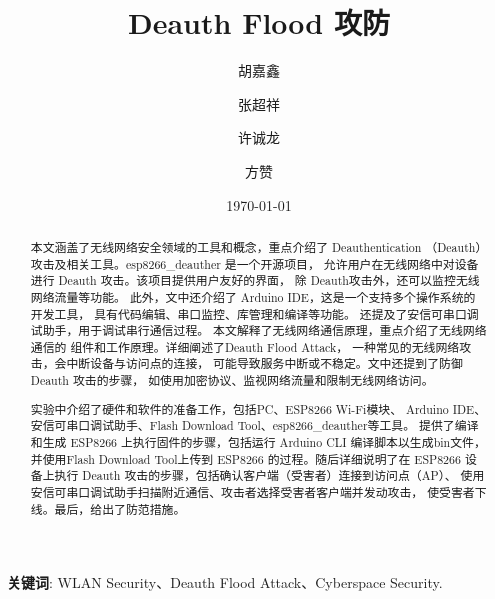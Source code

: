 \documentclass[UTF8, 12pt]{ctexart}
\title{Deauth Flood 攻防}
\author{胡嘉鑫 \and 张超祥 \and 许诚龙 \and 方赞}
\date{\today}
\begin{document}

\maketitle
\begin{abstract}
  本文涵盖了无线网络安全领域的工具和概念，重点介绍了 Deauthentication
  （Deauth）攻击及相关工具。esp8266\_deauther 是一个开源项目，
  允许用户在无线网络中对设备进行 Deauth 攻击。该项目提供用户友好的界面，
  除 Deauth攻击外，还可以监控无线网络流量等功能。
  此外，文中还介绍了 Arduino IDE，这是一个支持多个操作系统的开发工具，
  具有代码编辑、串口监控、库管理和编译等功能。
  还提及了安信可串口调试助手，用于调试串行通信过程。
  本文解释了无线网络通信原理，重点介绍了无线网络通信的
  组件和工作原理。详细阐述了Deauth Flood Attack，
  一种常见的无线网络攻击，会中断设备与访问点的连接，
  可能导致服务中断或不稳定。文中还提到了防御 Deauth 攻击的步骤，
  如使用加密协议、监视网络流量和限制无线网络访问。

  实验中介绍了硬件和软件的准备工作，包括PC、ESP8266 Wi-Fi模块、
  Arduino IDE、安信可串口调试助手、Flash Download Tool、esp8266\_deauther等工具。
  提供了编译和生成 ESP8266 上执行固件的步骤，包括运行 Arduino CLI 编译脚本以生成bin文件，
  并使用Flash Download Tool上传到 ESP8266 的过程。随后详细说明了在 ESP8266
  设备上执行 Deauth 攻击的步骤，包括确认客户端（受害者）连接到访问点（AP）、
  使用安信可串口调试助手扫描附近通信、攻击者选择受害者客户端并发动攻击，
  使受害者下线。最后，给出了防范措施。
\end{abstract}

\textbf{关键词}: WLAN Security、Deauth Flood Attack、Cyberspace Security.

\newpage
\tableofcontents
\newpage









\end{document}
